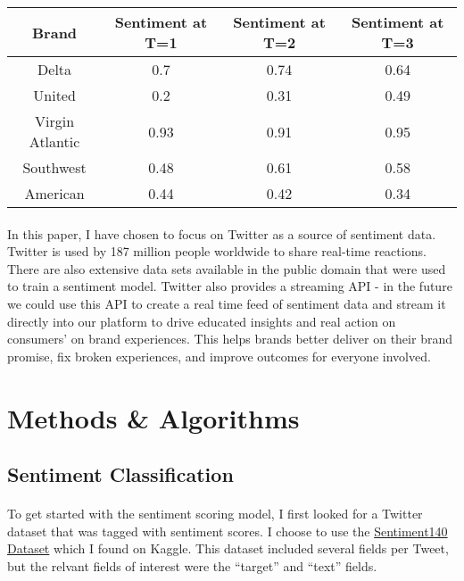 \documentclass{article}
\begin{document}
\begin{table}[h!]
    \centering
    \begin{tabular}{|c|c|c|c|}
        \hline
        \textbf{Brand} & \textbf{Sentiment at T=1} & \textbf{Sentiment at T=2} & \textbf{Sentiment at T=3}  \\
        \hline
        Delta & 0.7 & 0.74 & 0.64 \\
        \hline
        United & 0.2 & 0.31 & 0.49 \\
        \hline
        Virgin Atlantic & 0.93 & 0.91 & 0.95 \\
        \hline
        Southwest & 0.48 & 0.61 & 0.58 \\
        \hline
        American & 0.44 & 0.42 & 0.34 \\
        \hline
    \end{tabular}
\end{table}

\paragraph{} In this paper, I have chosen to focus on Twitter as a source of sentiment data. Twitter is used by 187 million people worldwide to share real-time reactions. There are also extensive data sets available in the public domain that were used to train a sentiment model. Twitter also provides a streaming API - in the future we could use this API to create a real time feed of sentiment data and stream it directly into our platform to drive educated insights and real action on consumers' on brand experiences. This helps brands better deliver on their brand promise, fix broken experiences, and improve outcomes for everyone involved.

\section{Methods \& Algorithms}

\subsection{Sentiment Classification} 

\paragraph{} To get started with the sentiment scoring model, I first looked for a Twitter dataset that was tagged with sentiment scores. I choose to use the \href{https://www.kaggle.com/kazanova/sentiment140}{Sentiment140 Dataset} which I found on Kaggle. This dataset included several fields per Tweet, but the relvant fields of interest were the ``target'' and ``text'' fields. 
\end{document}
